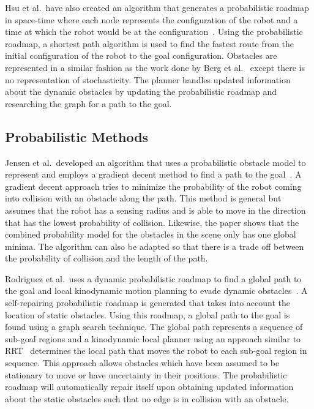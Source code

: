 \documentclass[letterpaper, 10pt, conference]{ieeeconf}
\begin{document}
Hsu et al.\ have also created an algorithm that generates a probabilistic
roadmap in space-time where each node represents the configuration of the robot
and a time at which the robot would be at the
configuration~\cite{hsu2002randomized}. Using the probabilistic roadmap, a
shortest path algorithm is used to find the fastest route from the initial
configuration of the robot to the goal configuration. Obstacles are represented
in a similar fashion as the work done by Berg et al.~\cite{van2006anytime}
except there is no representation of stochasticity. The planner handles updated
information about the dynamic obstacles by updating the probabilistic roadmap
and researching the graph for a path to the goal.

\subsection{Probabilistic Methods}

Jensen et al.\ developed an algorithm that uses a probabilistic obstacle model
to represent and employs a gradient decent method to find a path to the
goal~\cite{jensen2003motion}. A gradient decent approach tries to minimize the
probability of the robot coming into collision with an obstacle along the path.
This method is general but assumes that the robot has a sensing radius and is
able to move in the direction that has the lowest probability of collision.
Likewise, the paper shows that the combined probability model for the obstacles
in the scene only has one global minima. The algorithm can also be adapted so
that there is a trade off between the probability of collision and the length
of the path.

Rodriguez et al.\ uses a dynamic probabilistic roadmap to find a global path to
the goal and local kinodynamic motion planning to evade dynamic
obstacles~\cite{rodriguez2007framework}. A self-repairing probabilistic roadmap
is generated that takes into account the location of static obstacles. Using
this roadmap, a global path to the goal is found using a graph search
technique. The global path represents a sequence of sub-goal regions and a
kinodynamic local planner using an approach similar to RRT~\cite{rrt}
determines the local path that moves the robot to each sub-goal region in
sequence. This approach allows obstacles which have been assumed to be
stationary to move or have uncertainty in their positions. The probabilistic
roadmap will automatically repair itself upon obtaining updated information
about the static obstacles such that no edge is in collision with an obstacle.
\end{document}
